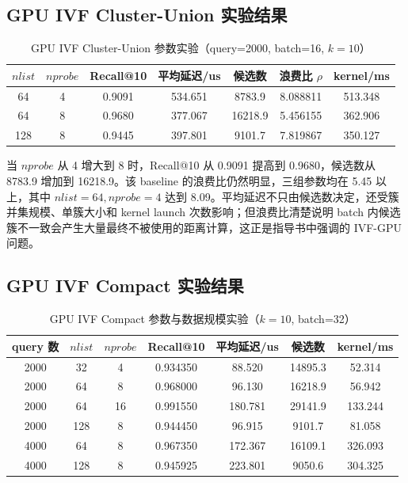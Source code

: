 \documentclass[a4paper]{article}
\begin{document}
\subsection{GPU IVF Cluster-Union 实验结果}

\begin{table}[H]
\centering
\caption{GPU IVF Cluster-Union 参数实验（query=2000, batch=16, $k=10$）}
\begin{tabular}{ccccccc}
\toprule
$nlist$ & $nprobe$ & Recall@10 & 平均延迟/us & 候选数 & 浪费比 $\rho$ & kernel/ms \\
\midrule
64 & 4 & 0.9091 & 534.651 & 8783.9 & 8.088811 & 513.348 \\
64 & 8 & 0.9680 & 377.067 & 16218.9 & 5.456155 & 362.906 \\
128 & 8 & 0.9445 & 397.801 & 9101.7 & 7.819867 & 350.127 \\
\bottomrule
\end{tabular}
\end{table}

当 $nprobe$ 从 4 增大到 8 时，Recall@10 从 0.9091 提高到 0.9680，候选数从 8783.9 增加到 16218.9。该 baseline 的浪费比仍然明显，三组参数均在 5.45 以上，其中 $nlist=64,nprobe=4$ 达到 8.09。平均延迟不只由候选数决定，还受簇并集规模、单簇大小和 kernel launch 次数影响；但浪费比清楚说明 batch 内候选簇不一致会产生大量最终不被使用的距离计算，这正是指导书中强调的 IVF-GPU 问题。

\subsection{GPU IVF Compact 实验结果}

\begin{table}[H]
\centering
\caption{GPU IVF Compact 参数与数据规模实验（$k=10$, batch=32）}
\begin{tabular}{ccccccc}
\toprule
query 数 & $nlist$ & $nprobe$ & Recall@10 & 平均延迟/us & 候选数 & kernel/ms \\
\midrule
2000 & 32 & 4 & 0.934350 & 88.520 & 14895.3 & 52.314 \\
2000 & 64 & 8 & 0.968000 & 96.130 & 16218.9 & 56.942 \\
2000 & 64 & 16 & 0.991550 & 180.781 & 29141.9 & 133.244 \\
2000 & 128 & 8 & 0.944450 & 96.915 & 9101.7 & 81.058 \\
4000 & 64 & 8 & 0.967350 & 172.367 & 16109.1 & 326.093 \\
4000 & 128 & 8 & 0.945925 & 223.801 & 9050.6 & 304.325 \\
\bottomrule
\end{tabular}
\end{table}
\end{document}
